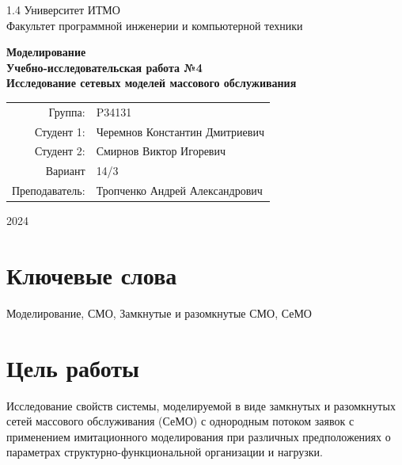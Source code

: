 \documentclass{article}
\begin{document}
\begin{titlepage}
  \begin{center}
    \begin{spacing}{1.4}
      \large{Университет ИТМО} \\
      \large{Факультет программной инженерии и компьютерной техники} \\
    \end{spacing}
    \vfill{}
    \textbf{
      \huge{Моделирование} \\
      \huge{Учебно-исследовательская работа №4} \\
      \huge{Исследование сетевых моделей массового обслуживания} \\
    }
  \end{center}
  \vfill{}
  \begin{center}
    \begin{tabular}{r l}
      Группа:        & P34131                         \\
      Студент 1:     & Черемнов Константин Дмитриевич \\
      Студент 2:     & Смирнов Виктор Игоревич        \\
      Вариант        & 14/3                           \\
      Преподаватель: & Тропченко Андрей Александрович \\
    \end{tabular}
  \end{center}
  \vfill{}
  \begin{center}
    \begin{large}
      2024
    \end{large}
  \end{center}
\end{titlepage}

\section*{Ключевые слова}

Моделирование, СМО, Замкнутые и разомкнутые СМО, СеМО

\tableofcontents

\section{Цель работы}

Исследование свойств системы, моделируемой в виде замкнутых и разомкнутых сетей массового обслуживания (СеМО) с однородным потоком заявок с применением имитационного моделирования при различных предположениях о параметрах структурно-функциональной организации и нагрузки.
\end{document}
